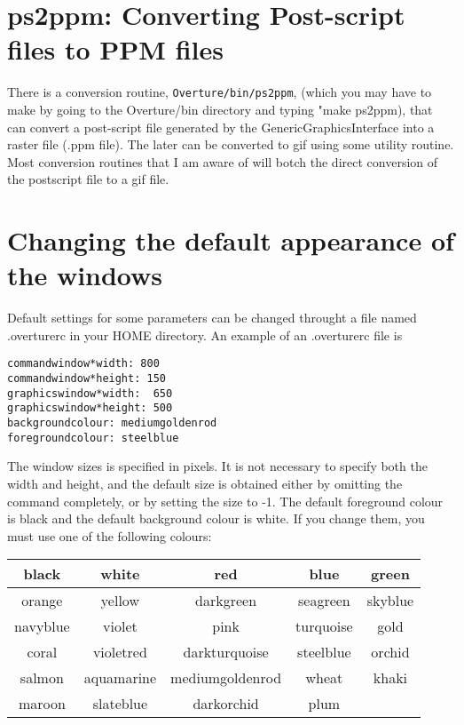 \documentclass{article}
\begin{document}
\section{ps2ppm: Converting Post-script files to PPM files}

There is a conversion routine, {\tt Overture/bin/ps2ppm}, (which you
may have to make by going to the Overture/bin directory and typing
"make ps2ppm), that can convert a post-script file generated by
the GenericGraphicsInterface into a raster file (.ppm file). The later can be converted
to gif using some utility routine. Most conversion routines that I am aware
of will botch the direct conversion of the postscript file to a gif file.
   
\section{Changing the default appearance of the windows}

Default settings for some parameters can be changed throught a file
named .overturerc in your HOME directory. An example of an
.overturerc file is
\begin{verbatim}
commandwindow*width: 800
commandwindow*height: 150
graphicswindow*width:  650
graphicswindow*height: 500
backgroundcolour: mediumgoldenrod
foregroundcolour: steelblue
\end{verbatim}
The window sizes is specified in pixels. It is not necessary to
specify both the width and height, and the default size is obtained
either by omitting the command completely, or by setting the size to
-1. The default foreground colour is black and the default background
colour is white. If you change them, you must use one of the
following colours:
\begin{center}
\begin{tabular}{c|c|c|c|c}
black    &  white     &  red            & blue      &  green   \\ \hline
orange   &  yellow    &  darkgreen      & seagreen  &  skyblue \\ \hline
navyblue &  violet    &  pink           & turquoise &  gold    \\ \hline
coral    &  violetred &  darkturquoise  & steelblue &  orchid  \\ \hline
salmon   & aquamarine & mediumgoldenrod & wheat     &  khaki   \\ \hline
maroon   &  slateblue & darkorchid      & plum      &
\end{tabular}
\end{center}
\end{document}
